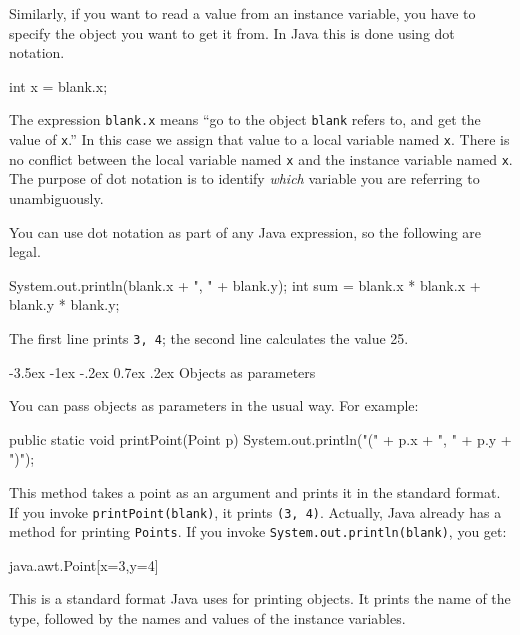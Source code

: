 \documentclass[12pt]{book}
\makeatletter
\renewcommand{\section}{\@startsection {section}{1}{\z@}%
    {-3.5ex \@plus -1ex \@minus -.2ex}%
    {0.7ex \@plus.2ex}%
    {\normalfont\Large\bfseries}}
\theoremstyle{exercise}
\newcommand{\java}[1]{\lstinline{#1}} %
\makeatother
\begin{document}

Similarly, if you want to read a value from an instance variable, you have to specify the object you want to get it from.
In Java this is done using dot notation.

\begin{code}
    int x = blank.x;
\end{code}

The expression \java{blank.x} means ``go to the object \java{blank} refers to, and get the value of \java{x}.''
In this case we assign that value to a local variable named \java{x}.
There is no conflict between the local variable named \java{x} and the instance variable named \java{x}.
The purpose of dot notation is to identify {\em which} variable you are referring to unambiguously.

You can use dot notation as part of any Java expression, so the following are legal.

\begin{code}
    System.out.println(blank.x + ", " + blank.y);
    int sum = blank.x * blank.x + blank.y * blank.y;
\end{code}

The first line prints \java{3, 4}; the second line calculates the value 25.


\section{Objects as parameters}


You can pass objects as parameters in the usual way.
For example:

\begin{code}
    public static void printPoint(Point p) {
        System.out.println("(" + p.x + ", " + p.y + ")");
    }
\end{code}

This method takes a point as an argument and prints it in the standard format.
If you invoke \java{printPoint(blank)}, it prints \java{(3, 4)}.
Actually, Java already has a method for printing \java{Points}.
If you invoke \java{System.out.println(blank)}, you get:

\begin{stdout}
java.awt.Point[x=3,y=4]
\end{stdout}

This is a standard format Java uses for printing objects.
It prints the name of the type, followed by the names and values of the instance variables.
\end{document}
